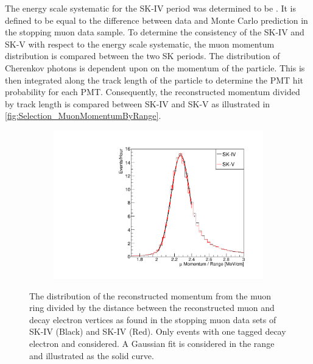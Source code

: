 The energy scale systematic for the SK-IV period was determined to be  \cite{sk_2017}. It is defined to be equal to the difference between data and Monte Carlo prediction in the stopping muon data sample. To determine the consistency of the SK-IV and SK-V with respect to the energy scale systematic, the muon momentum distribution is compared between the two SK periods. The distribution of Cherenkov photons is dependent upon on the momentum of the particle. This is then integrated along the track length of the particle to determine the PMT hit probability for each PMT. Consequently, the reconstructed momentum divided by track length is compared between SK-IV and SK-V as illustrated in \autoref{fig:Selection_MuonMomentumByRange}.

\begin{figure}[h]
  \begin{subfigure}[t]{\textwidth}
    \includegraphics[width=\textwidth, trim={0mm 0mm 0mm 0mm}, clip, page=1]{Figures/Selections/MuonRangeComparison.pdf}
  \end{subfigure}
  \caption{The distribution of the reconstructed momentum from the muon ring divided by the distance between the reconstructed muon and decay electron vertices as found in the stopping muon data sets of SK-IV (Black) and SK-IV (Red). Only events with one tagged decay electron and considered. A Gaussian fit is considered in the range  and illustrated as the solid curve.}
  \label{fig:Selection_MuonMomentumByRange}
\end{figure}

